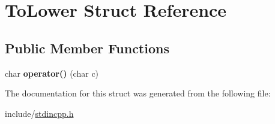 \hypertarget{structToLower}{}\section{To\+Lower Struct Reference}
\label{structToLower}
\subsection*{Public Member Functions}
\begin{DoxyCompactItemize}
\item 
\mbox{\label{structToLower_a578e65fd80472a1e9069a833595bfb42}} 
char {\bfseries operator()} (char c)
\end{DoxyCompactItemize}


The documentation for this struct was generated from the following file\+:\begin{DoxyCompactItemize}
\item 
include/\hyperlink{stdincpp_8h}{stdincpp.\+h}\end{DoxyCompactItemize}
